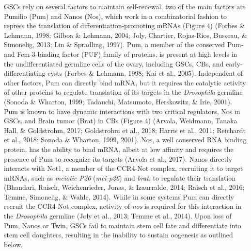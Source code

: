 \documentclass[12pt,oneside]{reedthesis}
\begin{document}
GSCs rely on several factors to maintain self-renewal, two of the main
factors are Pumilio (Pum) and Nanos (Nos), which work in a combinatorial
fashion to repress the translation of differentiation-promoting mRNAs
(Figure 4) (Forbes \& Lehmann, 1998; Gilboa \& Lehmann, 2004; Joly, Chartier, Rojas-Rios, Busseau, \& Simonelig, 2013; Lin \& Spradling, 1997).
Pum, a member of the conserved Pum- and Fem-3-binding factor (PUF)
family of proteins, is present at high levels in the undifferentiated
germline cells of the ovary, including GSCs, CBs, and
early-differentiating cysts (Forbes \& Lehmann, 1998; Kai et al., 2005). Independent of
other factors, Pum can directly bind mRNA, but it requires the catalytic
activity of other proteins to regulate translation of its targets in the
\emph{Drosophila} germline (Sonoda \& Wharton, 1999; Tadauchi, Matsumoto, Herskowitz, \& Irie, 2001). Pum is known
to have dynamic interactions with two critical regulators, Nos in GSCs,
and Brain tumor (Brat) in CBs (Figure 4) (Arvola, Weidmann, Tanaka Hall, \& Goldstrohm, 2017; Goldstrohm et al., 2018; Harris et al., 2011; Reichardt et al., 2018; Sonoda \& Wharton, 1999, 2001). Nos, a well conserved RNA binding protein, has the
ability to bind mRNA, albeit at low affinity and requires the presence
of Pum to recognize its targets (Arvola et al., 2017). Nanos directly
interacts with Not1, a member of the CCR4-Not complex, recruiting it to
target mRNAs, such as \emph{meiotic P26} (\emph{mei-p26}) and \emph{brat}, to regulate
their translation (Bhandari, Raisch, Weichenrieder, Jonas, \& Izaurralde, 2014; Raisch et al., 2016; Temme, Simonelig, \& Wahle, 2014).
While in some systems Pum can directly recruit the CCR4-Not complex,
activity of \emph{nos} is required for this interaction in the \emph{Drosophila}
germline (Joly et al., 2013; Temme et al., 2014). Upon loss of Pum, Nanos or Twin,
GSCs fail to maintain stem cell fate and differentiate into stem cell
daughters, resulting in the inability to sustain oogenesis as outlined
below.
\end{document}

